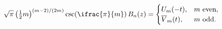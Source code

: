 \[\sqrt{\pi}\left(\tfrac{1}{2}m\right)^{(m-2)/(2m)}\mathop{\csc\/}\nolimits\!%
\left(\ifrac{\pi}{m}\right)\mathop{B_{n}\/}\nolimits\!\left(z\right)=\begin{%
cases}U_{m}(-t),&m\text{ even},\\
\overline{V}_{m}(t),&m\text{ odd}.\end{cases}\]